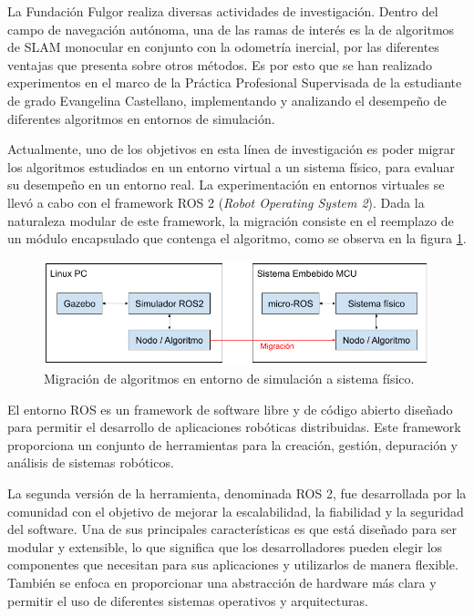 \documentclass[
11pt, %
codirector, %
]{charter}
\begin{document}
La Fundación Fulgor realiza diversas actividades de investigación. Dentro del campo de navegación autónoma, una de las ramas de interés es la de algoritmos de SLAM monocular en conjunto con la odometría inercial, por las diferentes ventajas que presenta sobre otros métodos. Es por esto que se han realizado experimentos en el marco de la Práctica Profesional Supervisada de la estudiante de grado Evangelina Castellano, implementando y analizando el desempeño de diferentes algoritmos en entornos de simulación.

Actualmente, uno de los objetivos en esta línea de investigación es poder migrar los algoritmos estudiados en un entorno virtual a un sistema físico, para evaluar su desempeño en un entorno real. La experimentación en entornos virtuales se llevó a cabo con el framework ROS 2 (\textit{Robot Operating System 2}).
Dada la naturaleza modular de este framework, la migración consiste en el reemplazo de un módulo encapsulado que contenga el algoritmo, como se observa en la figura \ref{fig:ros2-to-microros}. 

\begin{figure}[htpb]
\centering 
\includegraphics[width=.8\textwidth]{./Figuras/ros2-microros-migration.png}
\caption{Migración de algoritmos en entorno de simulación a sistema físico.}
\label{fig:ros2-to-microros}
\end{figure}


El entorno ROS es un framework de software libre y de código abierto diseñado para permitir el desarrollo de aplicaciones robóticas distribuidas. Este framework proporciona un conjunto de herramientas para la creación, gestión, depuración y análisis de sistemas robóticos.

La segunda versión de la herramienta, denominada ROS 2, fue desarrollada por la comunidad con el objetivo de mejorar la escalabilidad, la fiabilidad y la seguridad del software.
Una de sus principales características es que está diseñado para ser modular y extensible, lo que significa que los desarrolladores pueden elegir los componentes que necesitan para sus aplicaciones y utilizarlos de manera flexible. 
También se enfoca en proporcionar una abstracción de hardware más clara y permitir el uso de diferentes sistemas operativos y arquitecturas. 
\end{document}
